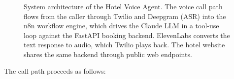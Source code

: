 \documentclass[conference]{IEEEtran}
\begin{document}
\begin{figure}[!t]
\caption{System architecture of the Hotel Voice Agent. The voice call path
flows from the caller through Twilio and Deepgram (ASR) into the n8n workflow
engine, which drives the Claude LLM in a tool-use loop against the FastAPI
booking backend. ElevenLabs converts the text response to audio, which Twilio
plays back. The hotel website shares the same backend through public web
endpoints.}
\label{fig:architecture}
\end{figure}

The call path proceeds as follows:
\end{document}
